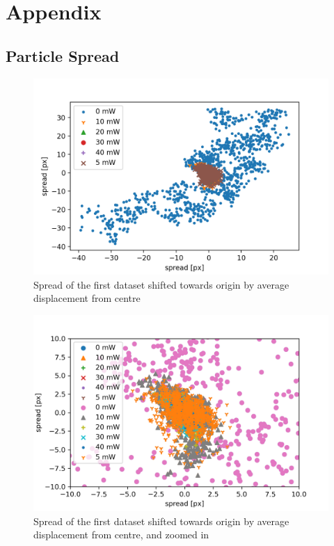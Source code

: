 \section{Appendix}

\subsection{Particle Spread}
\begin{figure}[!ht]
    \centering
    \includegraphics[width=.8\textwidth,keepaspectratio]{figures/spread-dataset1.png}
    \caption{Spread of the first dataset shifted towards origin by average displacement from centre}
\end{figure}
\begin{figure}[!ht]
    \centering
    \includegraphics[width=.8\textwidth,keepaspectratio]{figures/spread-zoom-dataset1.png}
    \caption{Spread of the first dataset shifted towards origin by average displacement from centre, and zoomed in}
\end{figure}
